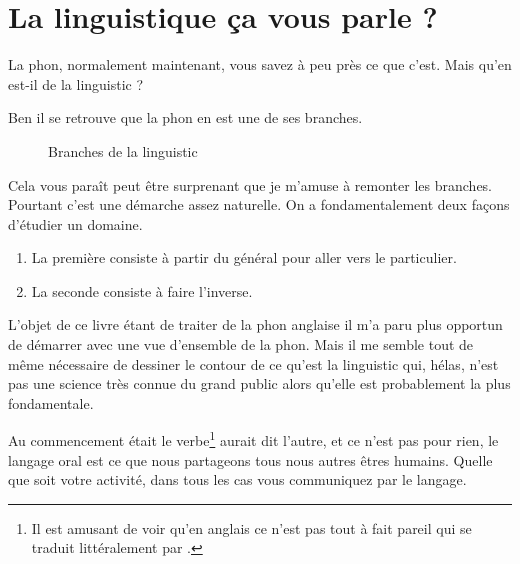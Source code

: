 \chapter{La linguistique ça vous parle ?}\label{chap:linguistic}

La \gls{phon}, normalement maintenant, vous savez à peu près ce que
c'est. Mais qu'en est-il de la \gls{linguistic} ?

Ben il se retrouve que la \gls{phon} en est une de ses branches.

\begin{center}
    \begin{figure}[h]
      \centering
    \caption{Branches de la \gls{linguistic}}
    \label{fig:branch-phon}
  \end{figure}
\end{center}
Cela vous paraît peut être surprenant que je m'amuse à remonter les
branches. Pourtant c'est une démarche assez naturelle. On a
fondamentalement deux façons d'étudier un domaine.

\begin{enumerate}
\item La première consiste à partir du général  pour aller vers le
  particulier.
\item La seconde consiste à faire l'inverse.  
\end{enumerate}

 L'objet de ce livre étant de traiter de la \gls{phon} anglaise il m'a
 paru plus opportun de démarrer avec une vue d'ensemble de la
 \gls{phon}. Mais il me semble tout de même nécessaire de dessiner le
 contour de ce qu'est la \gls{linguistic} qui, hélas, n'est pas une
 science très connue du grand public alors qu'elle est probablement la
 plus fondamentale.

 Au commencement était le verbe\footnote{Il est amusant de voir qu'en
   anglais ce n'est pas tout à fait pareil  qui se traduit littéralement par .} aurait dit l'autre, et ce n'est pas pour
 rien, le langage oral est ce que nous partageons tous nous autres
 êtres humains. Quelle que soit votre activité, dans tous les cas vous
 communiquez par le langage.

